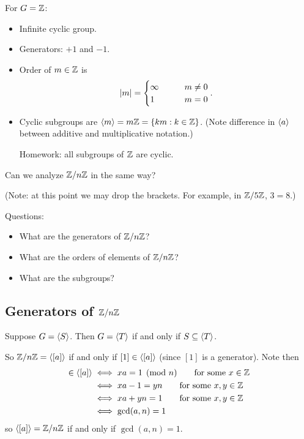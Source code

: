 \documentclass[12pt,letterpaper]{report}
\begin{document}
\begin{ex}
  For $G = \mathbb{Z}$:
  \begin{itemize}
    \item Infinite cyclic group.
    \item Generators: $+1$ and $-1$.
    \item Order of $m \in \mathbb{Z}$ is
    \[ \lvert m\rvert = \begin{cases}
      \infty \qquad & m \neq 0 \\
      1 & m = 0
    \end{cases}. \]
    \item Cyclic subgroups are $\langle m\rangle = m\mathbb{Z} = \{ km : k \in \mathbb{Z} \}$.
    (Note difference in $\langle a\rangle$ between additive and multiplicative notation.)

    Homework: all subgroups of $\mathbb{Z}$ are cyclic.
  \end{itemize}
\end{ex}

\begin{ex}
  Can we analyze $\mathbb{Z}/{n}\mathbb{Z}$ in the same way?

  (Note: at this point we may drop the brackets. For example, in $\mathbb{Z}/{5}\mathbb{Z}$, $3 = 8$.)

  Questions:
  \begin{itemize}
    \item What are the generators of $\mathbb{Z}/{n}\mathbb{Z}$?
    \item What are the orders of elements of $\mathbb{Z}/{n}\mathbb{Z}$?
    \item What are the subgroups?
  \end{itemize}
\end{ex}

\pagebreak
\subsection[Generators of Z/nZ]{Generators of $\mathbb{Z}/{n}\mathbb{Z}$}

\begin{lem}{}{}
  Suppose $G = \langle S\rangle$.
  Then $G = \langle T\rangle$ if and only if $S \subseteq \langle T\rangle$.
\end{lem}

So $\mathbb{Z}/{n}\mathbb{Z} = \langle[a]\rangle$ if and only if $[1] \in \langle[a]\rangle$ (since $[1]$ is a
generator).
Note then
\begin{align*}
  [1] \in \ang{[a]} &\iff xa = 1 \pmod{n} \qquad \text{for some } x \in \Z \\
  &\iff xa - 1 = yn \qquad \text{for some } x, y \in \Z \\
  &\iff xa + yn = 1 \qquad \text{for some } x, y \in \Z \\
  &\iff \gcd(a, n) = 1
\end{align*}
so $\langle[a]\rangle = \mathbb{Z}/{n}\mathbb{Z}$ if and only if $\gcd(a, n) = 1$.
\end{document}
